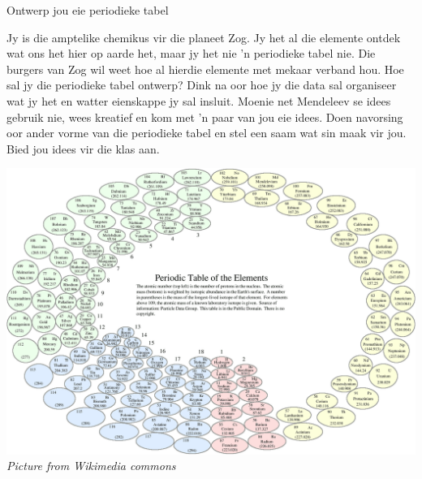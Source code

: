 \begin{activity}{Ontwerp jou eie periodieke tabel}
            \nopagebreak
            \label{m38760*eip-603}
\begin{minipage}{.5\textwidth}
Jy is die amptelike chemikus vir die planeet Zog. Jy het al die elemente ontdek wat ons het hier op aarde het, maar jy het nie 'n periodieke tabel nie. Die burgers van Zog wil weet hoe al hierdie elemente met mekaar verband hou. Hoe sal jy die periodieke tabel ontwerp? Dink na oor hoe jy die data sal organiseer wat jy het en watter eienskappe jy sal insluit. Moenie net Mendeleev se idees gebruik nie, wees kreatief en kom met 'n paar van jou eie idees. Doen navorsing oor ander vorme van die periodieke tabel en stel een saam wat sin maak vir jou. Bied jou idees vir die klas aan.
\end{minipage}
\begin{minipage}{.5\textwidth}
\begin{center}
\includegraphics[width=.8\textwidth]{photos/Circular_periodic_table.png}\\
\textsl{Picture from Wikimedia commons}
\end{center}
\end{minipage}

\end{activity}
            \nopagebreak
